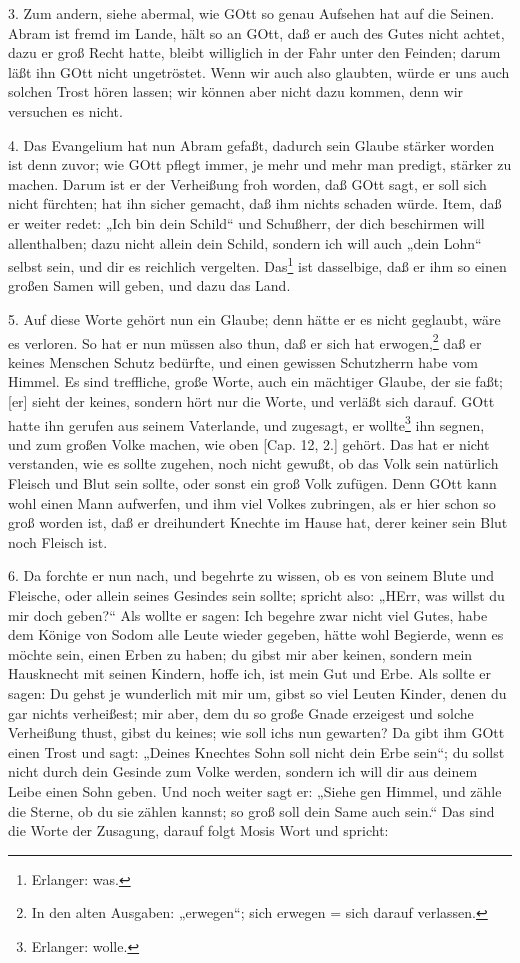 3. Zum andern, siehe abermal, wie GOtt so genau Aufsehen hat auf die Seinen. Abram ist fremd im Lande, hält so an GOtt, daß er auch des Gutes nicht achtet, dazu er groß Recht hatte, bleibt williglich in der Fahr unter den Feinden; darum läßt ihn GOtt nicht ungetröstet. Wenn wir auch also glaubten, würde er uns auch solchen Trost hören lassen; wir können aber nicht dazu kommen, denn wir versuchen es nicht.

4. Das Evangelium hat nun Abram gefaßt, dadurch sein Glaube stärker worden ist denn zuvor; wie GOtt pflegt immer, je mehr und mehr man predigt, stärker zu machen. Darum ist er der Verheißung froh worden, daß GOtt sagt, er soll sich nicht fürchten; hat ihn sicher gemacht, daß ihm nichts schaden würde. Item, daß er weiter redet: „Ich bin dein Schild“ und Schußherr, der dich beschirmen will allenthalben; dazu nicht allein dein Schild, sondern ich will auch „dein Lohn“ selbst sein, und dir es reichlich vergelten. Das\footnote{Erlanger: was.} ist dasselbige, daß er ihm so einen großen Samen will geben, und dazu das Land.

5. Auf diese Worte gehört nun ein Glaube; denn hätte er es nicht geglaubt, wäre es verloren. So hat er nun müssen also thun, daß er sich hat erwogen,\footnote{In den alten Ausgaben: „erwegen“; sich erwegen = sich darauf verlassen.} daß er keines Menschen Schutz bedürfte, und einen gewissen Schutzherrn habe vom Himmel. Es sind treffliche, große Worte, auch ein mächtiger Glaube, der sie faßt; [er] sieht der keines, sondern hört nur die Worte, und verläßt sich darauf. GOtt hatte ihn gerufen aus seinem Vaterlande, und zugesagt, er wollte\footnote{Erlanger: wolle.} ihn segnen, und zum großen Volke machen, wie oben [Cap. 12, 2.] gehört. Das hat er nicht verstanden, wie es sollte zugehen, noch nicht gewußt, ob das Volk sein natürlich Fleisch und Blut sein sollte, oder sonst ein groß Volk zufügen. Denn GOtt kann wohl einen Mann aufwerfen, und ihm viel Volkes zubringen, als er hier schon so groß worden ist, daß er dreihundert Knechte im Hause hat, derer keiner sein Blut noch Fleisch ist.

6. Da forchte er nun nach, und begehrte zu wissen, ob es von seinem Blute und Fleische, oder allein seines Gesindes sein sollte; spricht also: „HErr, was willst du mir doch geben?“ Als wollte er sagen: Ich begehre zwar nicht viel Gutes, habe dem Könige von Sodom alle Leute wieder gegeben, hätte wohl Begierde, wenn es möchte sein, einen Erben zu haben; du gibst mir aber keinen, sondern mein Hausknecht mit seinen Kindern, hoffe ich, ist mein Gut und Erbe. Als sollte er sagen: Du gehst je wunderlich mit mir um, gibst so viel Leuten Kinder, denen du gar nichts verheißest; mir aber, dem du so große Gnade erzeigest und solche Verheißung thust, gibst du keines; wie soll ichs nun gewarten? Da gibt ihm GOtt einen Trost und sagt: „Deines Knechtes Sohn soll nicht dein Erbe sein“; du sollst nicht durch dein Gesinde zum Volke werden, sondern ich will dir aus deinem Leibe einen Sohn geben. Und noch weiter sagt er: „Siehe gen Himmel, und zähle die Sterne, ob du sie zählen kannst; so groß soll dein Same auch sein.“ Das sind die Worte der Zusagung, darauf folgt Mosis Wort und spricht:

